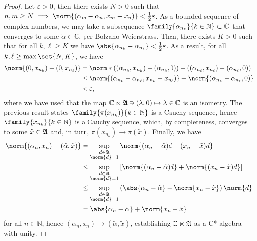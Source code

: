 \begin{proof}
    Let \(\varepsilon > 0\), then there exists \(N > 0\) such that \(n, m \geq N \implies \norm{(\alpha_m - \alpha_n, x_m - x_n)} < \frac12 \varepsilon\). As a bounded sequence of complex numbers, we may take a subsequence \(\family{\alpha_{n_k}}{k\in \mathbb{N}} \subset \mathbb{C}\) that converges to some \(\tilde{\alpha} \in \mathbb{C}\), per Bolzano-Weierstrass. Then, there exists \(K > 0\) such that for all \(k, \ell \geq K\) we have \(\abs{\alpha_{n_k} - \alpha_{n_\ell}} < \frac12 \varepsilon\). As a result, for all \(k, \ell \geq \max{\set{N, K}}\), we have
    \begin{align*}
        \norm{(0, x_{n_k}) - (0, x_{n_\ell})} &= \norm*{\left((\alpha_{n_k}, x_{n_k}) - (\alpha_{n_k}, 0)\right) - \left((\alpha_{n_\ell}, x_{n_\ell}) - (\alpha_{n_\ell}, 0)\right)}\\
                                              &\leq \norm{(\alpha_{n_k} - \alpha_{n_\ell}, x_{n_k} - x_{n_\ell})} + \norm{(\alpha_{n_k} - \alpha_{n_\ell}, 0)}\\
                                              &< \varepsilon,
    \end{align*}
    where we have used that the map \(\mathbb{C} \ltimes \mathfrak{A} \ni (\lambda,0) \mapsto \lambda \in \mathbb{C}\) is an isometry. The previous result states \(\family{\pi(x_{n_k})}{k \in \mathbb{N}}\) is a Cauchy sequence, hence \(\family{x_{n_k}}{k \in \mathbb{N}}\) is a Cauchy sequence, which, by completeness, converges to some \(\tilde{x} \in \mathfrak{A}\) and, in turn, \(\pi(x_{n_k}) \to \pi(\tilde{x})\). Finally, we have
    \begin{align*}
        \norm{(\alpha_n, x_n) - (\tilde{\alpha}, \tilde{x})} &= \sup_{\substack{d\in\algebra{A}\\\norm{d}=1}}{\norm{(\alpha_n - \tilde{\alpha})d + (x_n - \tilde{x})d}}\\
                                                             &\leq \sup_{\substack{d\in\algebra{A}\\\norm{d}=1}}{\left[\norm{(\alpha_n - \tilde{\alpha})d} + \norm{(x_n - \tilde{x})d}\right]}\\
                                                             &\leq \sup_{\substack{d\in\algebra{A}\\\norm{d}=1}}{\left(\abs{\alpha_n - \tilde{\alpha}} + \norm{x_n - \tilde{x}}\right)\norm{d}}\\
                                                             &=\abs{\alpha_n - \tilde{\alpha}} + \norm{x_n - \tilde{x}}
    \end{align*}
    for all \(n \in \mathbb{N}\), hence \((\alpha_n, x_n) \to (\tilde{\alpha}, \tilde{x})\), establishing \(\mathbb{C} \ltimes \mathfrak{A}\) as a C*-algebra with unity.
\end{proof}

